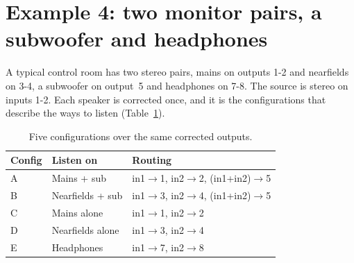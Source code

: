 \section{Example 4: two monitor pairs, a subwoofer and headphones}\label{sec:ex-studio}

A typical control room has two stereo pairs, mains on outputs 1-2 and nearfields on 3-4, a subwoofer on output~5 and headphones on 7-8. The source is stereo on inputs 1-2. Each speaker is corrected once, and it is the configurations that describe the ways to listen (Table~\ref{tab:ex-studio}).

\begin{table}[h]\centering
\begin{tabular}{lll}
\toprule
Config & Listen on & Routing \\
\midrule
A & Mains + sub      & in1$\rightarrow$1,\; in2$\rightarrow$2,\; (in1+in2)$\rightarrow$5 \\
B & Nearfields + sub & in1$\rightarrow$3,\; in2$\rightarrow$4,\; (in1+in2)$\rightarrow$5 \\
C & Mains alone      & in1$\rightarrow$1,\; in2$\rightarrow$2 \\
D & Nearfields alone & in1$\rightarrow$3,\; in2$\rightarrow$4 \\
E & Headphones       & in1$\rightarrow$7,\; in2$\rightarrow$8 \\
\bottomrule
\end{tabular}
\caption{Five configurations over the same corrected outputs.}\label{tab:ex-studio}
\end{table}

